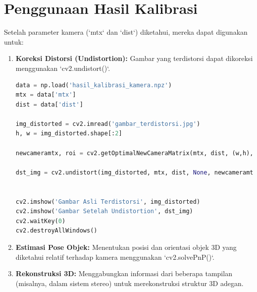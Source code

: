 \documentclass[12pt,a4paper]{article}
\begin{document}
\section{Penggunaan Hasil Kalibrasi}
Setelah parameter kamera (`mtx` dan `dist`) diketahui, mereka dapat digunakan
untuk:
\begin{enumerate}[label=\alph*.]
    \item \textbf{Koreksi Distorsi (Undistortion):}
          Gambar yang terdistorsi dapat dikoreksi menggunakan `cv2.undistort()`.
\begin{lstlisting}[caption=Contoh Undistortion, language=Python]
data = np.load('hasil_kalibrasi_kamera.npz')
mtx = data['mtx']
dist = data['dist']

img_distorted = cv2.imread('gambar_terdistorsi.jpg')
h, w = img_distorted.shape[:2]

newcameramtx, roi = cv2.getOptimalNewCameraMatrix(mtx, dist, (w,h), 1, (w,h))

dst_img = cv2.undistort(img_distorted, mtx, dist, None, newcameramtx)


cv2.imshow('Gambar Asli Terdistorsi', img_distorted)
cv2.imshow('Gambar Setelah Undistortion', dst_img)
cv2.waitKey(0)
cv2.destroyAllWindows()
\end{lstlisting}

    \item \textbf{Estimasi Pose Objek:} Menentukan posisi dan orientasi objek 3D yang diketahui relatif terhadap kamera menggunakan `cv2.solvePnP()`.
    \item \textbf{Rekonstruksi 3D:} Menggabungkan informasi dari beberapa tampilan (misalnya, dalam sistem stereo) untuk merekonstruksi struktur 3D adegan.
\end{enumerate}
\end{document}

